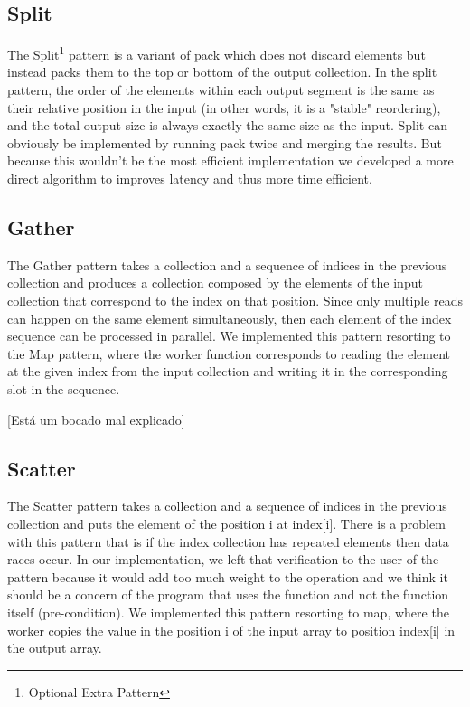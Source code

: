 \documentclass[conference,compsoc]{IEEEtran}
\begin{document}
\subsection{Split}
The Split\footnote[1]{Optional Extra Pattern} pattern is a variant of pack which does not discard elements but instead packs them to the top or bottom of the output collection.
In the split pattern, the order of the elements within each output segment is the same as their relative position in the input (in other words, it is a "stable" reordering), and the total output size is always exactly the same size as the input.
Split can obviously be implemented by running pack twice and merging the results. But because this wouldn't be the most efficient implementation we developed a more direct algorithm to improves latency and thus more time
efficient.

\subsection{Gather}

The Gather pattern takes a collection and a sequence of indices in the previous collection and produces a collection composed by the elements of the input collection that correspond to the index on that position. Since only multiple reads can happen on the same element simultaneously, then each element of the index sequence can be processed in parallel. We implemented this pattern resorting to the Map pattern, where the worker function corresponds to reading the element at the given index from the input collection and writing it in the corresponding slot in the sequence.

[Está um bocado mal explicado]

\subsection{Scatter}

The Scatter pattern takes a collection and a sequence of indices in the previous collection and puts the element of the position i at index[i]. There is a problem with this pattern that is if the index collection has repeated elements then data races occur. In our implementation, we left that verification to the user of the pattern because it would add too much weight to the operation and we think it should be a concern of the program that uses the function and not the function itself (pre-condition). We implemented this pattern resorting to map, where the worker copies the value in the position i of the input array to position index[i] in the output array.
\end{document}
